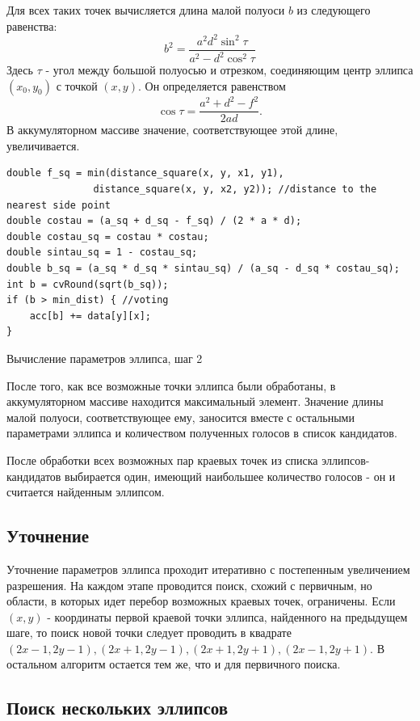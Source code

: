 Для всех таких точек вычисляется длина малой полуоси \(b\) из следующего равенства:
$$b^2 = \frac{a^2d^2\sin^2\tau}{a^2-d^2\cos^2\tau}$$
Здесь \(\tau\) - угол между большой полуосью и отрезком, соединяющим центр эллипса \((x_0, y_0)\) с точкой \((x, y)\). Он определяется равенством
$$\cos\tau = \frac{a^2 + d^2 - f^2}{2ad}.$$
В аккумуляторном массиве значение, соответствующее этой длине, увеличивается.
\begin{ListingEnv}[H]
\begin{lstlisting}
double f_sq = min(distance_square(x, y, x1, y1),
               distance_square(x, y, x2, y2)); //distance to the nearest side point
double costau = (a_sq + d_sq - f_sq) / (2 * a * d);
double costau_sq = costau * costau;
double sintau_sq = 1 - costau_sq;
double b_sq = (a_sq * d_sq * sintau_sq) / (a_sq - d_sq * costau_sq);
int b = cvRound(sqrt(b_sq));
if (b > min_dist) { //voting
    acc[b] += data[y][x];
}
\end{lstlisting}
\caption{Вычисление параметров эллипса, шаг 2}
\label{list:minoraxis}
\end{ListingEnv}

После того, как все возможные точки эллипса были обработаны, в аккумуляторном массиве находится максимальный элемент. 
Значение длины малой полуоси, соответствующее ему, заносится вместе с остальными параметрами эллипса и количеством полученных голосов в список кандидатов.

После обработки всех возможных пар краевых точек из списка эллипсов-кандидатов выбирается один, имеющий наибольшее количество голосов - он и считается найденным эллипсом.

\subsection{Уточнение}
Уточнение параметров эллипса проходит итеративно с постепенным увеличением разрешения.
На каждом этапе проводится поиск, схожий с первичным, но области, в которых идет перебор возможных краевых точек, ограничены.
Если \((x, y)\) - координаты первой краевой точки эллипса, найденного на предыдущем шаге, то поиск новой точки следует 
проводить в квадрате \((2x - 1, 2y - 1), (2x + 1, 2y - 1), (2x + 1, 2y + 1), (2x - 1, 2y + 1)\). В остальном алгоритм остается тем же, что и для первичного поиска.

\subsection{Поиск нескольких эллипсов}

